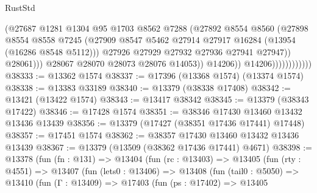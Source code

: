 \begin{lexlean}{RustStd}
\begin{coremodule}
                                        (@27687
                                          @1281
                                          @1304
                                          @95
                                          @1703
                                          @8562
                                          @7288
                                          (@27892
                                            @8554
                                            @8560
                                            (@27898
                                              @8554
                                              @8558
                                              @7245
                                              (@27909
                                                @8547
                                                @5462
                                                @27914
                                                @27917
                                                @16284
                                                (@13954 (@16286 @8548 @5112)))
                                              @27926
                                              @27929
                                              @27932
                                              @27936
                                              @27941
                                              @27947))
                                          @28061)))
                                    @28067
                                    @28070
                                    @28073
                                    @28076
                                    @14053))
                                @14206))
                            @14206))))))))))))
@38333 := @13362 @1574
@38337 := @17396 (@13368 @1574) (@13374 @1574)
@38338 := @13383 @33189
@38340 := @13379 (@38338 @17408)
@38342 := @13421 (@13422 @1574)
@38343 := @13417 @38342
@38345 := @13379 (@38343 @17422)
@38346 := @17428 @1574
@38351 := @38346 @17430 @13460 @13432 @13436 @13439
@38356 := @13379 (@17427 (@38351 @17436 @17441) @17448)
@38357 := @17451 @1574
@38362 := @38357 @17430 @13460 @13432 @13436 @13439
@38367 := @13379 (@13509 (@38362 @17436 @17441) @4671)
@38398 := @13378
    (fun (fn : @131) =>
    @13404
      (fun (rc : @13403) =>
      @13405
        (fun (rty : @4551) =>
        @13407
          (fun (lets0 : @13406) =>
          @13408
            (fun (tail0 : @5050) =>
            @13410
              (fun (Γ : @13409) =>
              @17403
                (fun (ps : @17402) =>
                @13405

\end{coremodule}
\end{lexlean}
